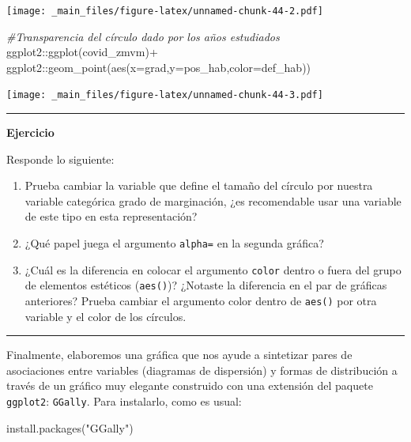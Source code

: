 \documentclass[
  11pt,
  oneside]{book}
\newenvironment{Shaded}{\begin{snugshade}}{\end{snugshade}}
\newcommand{\AttributeTok}[1]{\textcolor[rgb]{0.77,0.63,0.00}{#1}}
\newcommand{\CommentTok}[1]{\textcolor[rgb]{0.56,0.35,0.01}{\textit{#1}}}
\newcommand{\FunctionTok}[1]{\textcolor[rgb]{0.00,0.00,0.00}{#1}}
\newcommand{\NormalTok}[1]{#1}
\newcommand{\SpecialCharTok}[1]{\textcolor[rgb]{0.00,0.00,0.00}{#1}}
\newcommand{\StringTok}[1]{\textcolor[rgb]{0.31,0.60,0.02}{#1}}
\begin{document}
\texttt{[image: \_main\_files/figure-latex/unnamed-chunk-44-2.pdf]}

\begin{Shaded}
\begin{Highlighting}[]
\CommentTok{\#Transparencia del círculo dado por los años estudiados}
\NormalTok{ggplot2}\SpecialCharTok{::}\FunctionTok{ggplot}\NormalTok{(covid\_zmvm)}\SpecialCharTok{+}
\NormalTok{  ggplot2}\SpecialCharTok{::}\FunctionTok{geom\_point}\NormalTok{(}\FunctionTok{aes}\NormalTok{(}\AttributeTok{x=}\NormalTok{grad,}\AttributeTok{y=}\NormalTok{pos\_hab,}\AttributeTok{color=}\NormalTok{def\_hab))}
\end{Highlighting}
\end{Shaded}

\texttt{[image: \_main\_files/figure-latex/unnamed-chunk-44-3.pdf]}

\begin{center}\rule{0.5\linewidth}{0.5pt}\end{center}

\textbf{Ejercicio}

Responde lo siguiente:

\begin{enumerate}
\def\labelenumi{\roman{enumi}.}
\item
  Prueba cambiar la variable que define el tamaño del círculo por nuestra variable categórica grado de marginación, ¿es recomendable usar una variable de este tipo en esta representación?
\item
  ¿Qué papel juega el argumento \texttt{alpha=} en la segunda gráfica?
\item
  ¿Cuál es la diferencia en colocar el argumento \texttt{color} dentro o fuera del grupo de elementos estéticos (\texttt{aes()})? ¿Notaste la diferencia en el par de gráficas anteriores? Prueba cambiar el argumento color dentro de \texttt{aes()} por otra variable y el color de los círculos.
\end{enumerate}

\begin{center}\rule{0.5\linewidth}{0.5pt}\end{center}

Finalmente, elaboremos una gráfica que nos ayude a sintetizar pares de asociaciones entre variables (diagramas de dispersión) y formas de distribución a través de un gráfico muy elegante construido con una extensión del paquete \texttt{ggplot2}: \texttt{GGally}. Para instalarlo, como es usual:

\begin{Shaded}
\begin{Highlighting}[]
\FunctionTok{install.packages}\NormalTok{(}\StringTok{"GGally"}\NormalTok{)}
\end{Highlighting}
\end{Shaded}
\end{document}
